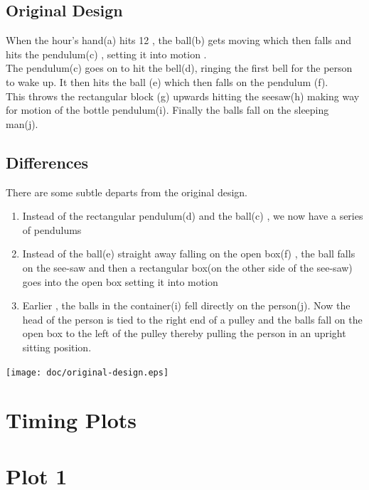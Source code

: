 \documentclass[a4paper,11pt]{report}
\begin{document}
\subsection{Original Design}
When the hour's hand(a) hits 12 , the ball(b) gets moving which then falls and hits the pendulum(c) , setting it into motion . \\
    The pendulum(c) goes on to hit the bell(d), ringing the first bell for the person to wake up. It then hits the ball (e) which then falls on the pendulum (f).
	\\ This throws the rectangular block (g) upwards hitting the seesaw(h) making way for motion of the bottle pendulum(i). Finally the balls fall
	on the sleeping man(j).

\subsection{Differences}
There are some subtle departs from the original design. 
\begin{enumerate}
   \item 
Instead of the rectangular pendulum(d) and the ball(c) , we now have a series of pendulums
   \item
 Instead of the ball(e) straight away falling on the open box(f)  , the ball falls on the see-saw and then 
 a rectangular box(on the other side of the see-saw) goes into the open box setting it into motion  
  \item
 Earlier , the balls in the container(i) fell directly on the person(j). Now the head of the person is tied to the right end of a pulley and the balls fall on the open box to the left of the pulley thereby pulling the person in an upright sitting position.   
 \end{enumerate}

\texttt{[image: doc/original-design.eps]}







\section{Timing Plots}
\section{Plot 1}
\end{document}
